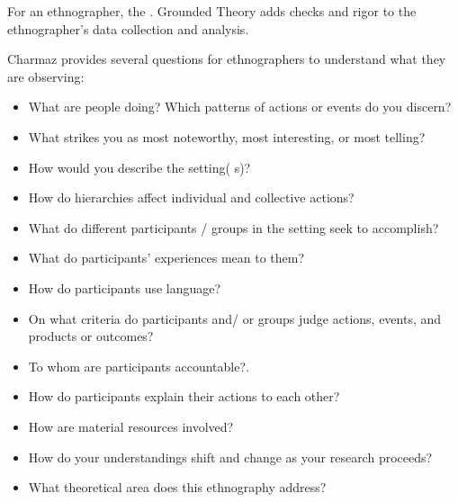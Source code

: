 
For an ethnographer, the  \cite{Charmaz}. Grounded Theory adds checks and rigor to the ethnographer's data collection and analysis. 

Charmaz provides several questions for ethnographers to understand what they are observing:
\begin{itemize}
\item What are people doing? Which patterns of actions or events do you discern?
\item What strikes you as most noteworthy, most interesting, or most telling?
\item How would you describe the setting( s)?
\item How do hierarchies affect individual and collective actions?
\item What do different participants / groups in the setting seek to accomplish?
\item What do participants' experiences mean to them?
\item How do participants use language?
\item On what criteria do participants and/ or groups judge actions, events, and products or outcomes?
\item To whom are participants accountable?.
\item How do participants explain their actions to each other?
\item How are material resources involved?
\item How do your understandings shift and change as your research proceeds?
\item What theoretical area does this ethnography address? \cite{Charmaz}
\end{itemize}

